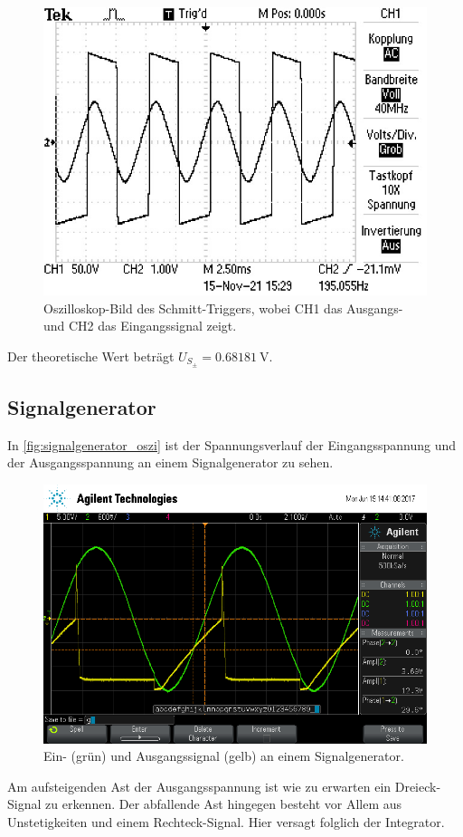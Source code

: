 \begin{figure}[H]
  \centering
  \includegraphics{data/ALL0066/F0066TEK.JPG}
  \caption{Oszilloskop-Bild des Schmitt-Triggers, wobei CH1 das Ausgangs- und CH2 das Eingangssignal zeigt.}
  \label{fig:schmitt_oszi}
\end{figure}

Der theoretische Wert beträgt $U_{S_{\pm}} = \SI{0.68181}{\volt}$.

\subsection{Signalgenerator}
In \autoref{fig:signalgenerator_oszi} ist der Spannungsverlauf der Eingangsspannung und der Ausgangsspannung an einem Signalgenerator zu sehen.

\begin{figure}[H]
  \centering
  \includegraphics[width=\textwidth]{signalgen.png}
  \caption{Ein- (grün) und Ausgangssignal (gelb) an einem Signalgenerator.}
  \label{fig:signalgenerator_oszi}
\end{figure}
Am aufsteigenden Ast der Ausgangsspannung ist wie zu erwarten ein Dreieck-Signal zu erkennen. Der abfallende Ast hingegen besteht vor Allem aus Unstetigkeiten und einem Rechteck-Signal. Hier versagt folglich der Integrator.
